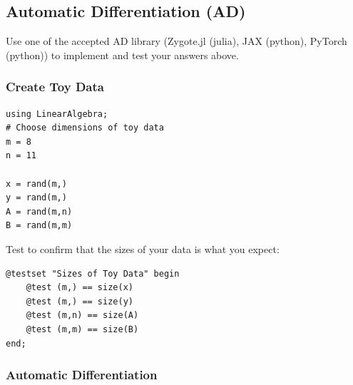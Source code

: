 \documentclass[12pt,letter]{article}
\begin{document}
\subsection{Automatic Differentiation (AD)}

Use one of the accepted AD library (Zygote.jl (julia), JAX (python), PyTorch (python))
to implement and test your answers above.

\subsubsection{Create Toy Data}
\begin{verbatim}
using LinearAlgebra;
# Choose dimensions of toy data
m = 8
n = 11

x = rand(m,)
y = rand(m,)
A = rand(m,n)
B = rand(m,m)
\end{verbatim}

Test to confirm that the sizes of your data is what you expect:
\begin{verbatim}
@testset "Sizes of Toy Data" begin
    @test (m,) == size(x)
    @test (m,) == size(y)
    @test (m,n) == size(A)
    @test (m,m) == size(B)
end;
\end{verbatim}

\subsubsection{Automatic Differentiation}
\end{document}
